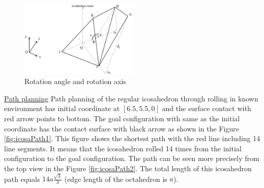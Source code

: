 \begin{figure}[h]
\centering
	\includegraphics[width=0.5\textwidth]{image/icosaGeo55.png}
	\caption{Rotation angle and rotation axis}
	\label{fig:icosaGeo5}
\end{figure}

%
%
\noindent\uline{Path planning} 
Path planning of the regular icosahedron through rolling in known environment has initial coordinate at $[6.5, 5.5, 0]$ and the surface contact with red arrow points to bottom. 
The goal configuration with same as the initial coordinate has the contact surface with black arrow as shown in the Figure \ref{fig:icosaPath1}. 
This figure shows the shortest path with the red line including 14 line segments. 
It means that the icosahedron rolled 14 times from the initial configuration to the goal configuration. 
The path can be seen more precisely from the top view in the Figure \ref{fig:icosaPath2}.
The total length of this icosahedron path equals $14a\frac{\sqrt{3}}{3}$ (edge length of the octahedron is $a$).

